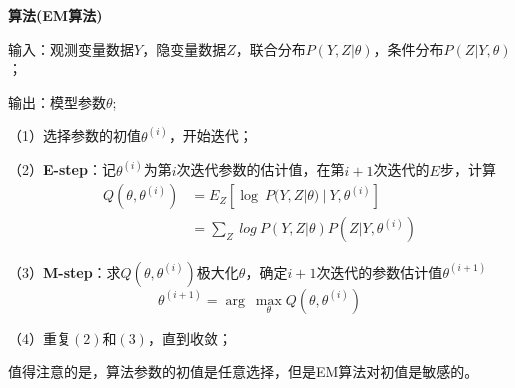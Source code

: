 \begin{framed}
    \textbf{算法(EM算法)}

    输入：观测变量数据$Y$，隐变量数据$Z$，联合分布$P(Y,Z|\theta)$，条件分布$P(Z|Y,\theta)$；
    
    输出：模型参数$\theta$;

    （1）选择参数的初值$\theta^{(i)}$，开始迭代；

    （2）\textbf{E-step}：记$\theta^{(i)}$为第$i$次迭代参数的估计值，在第$i+1$次迭代的$E$步，计算
    \begin{equation}
        \begin{aligned}
            Q(\theta,\theta^{(i)})&=E_Z\left[\log\ P(Y,Z|\theta)\ |\ Y,\theta^{(i)}\right]\\
            &=\sum_{Z}\ log\ P(Y,Z|\theta)P(Z|Y,\theta^{(i)})         
        \end{aligned}
    \end{equation}

    （3）\textbf{M-step}：求$Q(\theta,\theta^{(i)})$极大化$\theta$，确定$i+1$次迭代的参数估计值$\theta^{(i+1)}$
    \begin{equation}
        \theta^{(i+1)}=\arg\ \max_{\theta}Q(\theta,\theta^{(i)})
    \end{equation}

    （4）重复$(2)$和$(3)$，直到收敛；

\end{framed}

值得注意的是，算法参数的初值是任意选择，但是EM算法对初值是敏感的。




